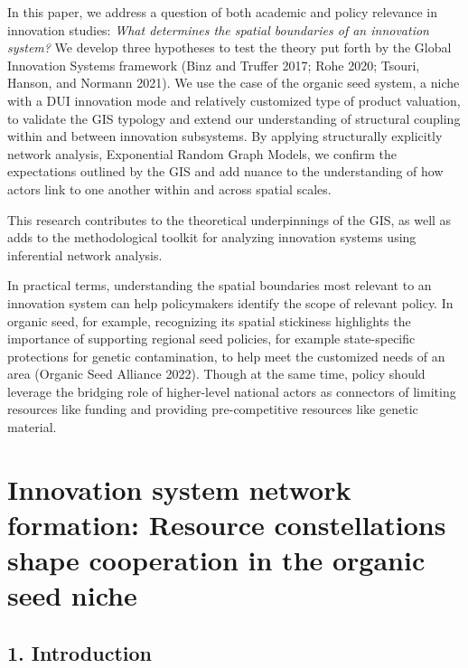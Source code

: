 \documentclass[twoside,12pt,final]{ucthesis-CA2012}
\begin{document}
\begin{ucmainmatter}
In this paper, we address a question of both academic and policy
relevance in innovation studies: \emph{What determines the spatial boundaries
of an innovation system?} We develop three hypotheses to test the theory
put forth by the Global Innovation Systems framework (Binz and Truffer
2017; Rohe 2020; Tsouri, Hanson, and Normann
2021). We use the case of
the organic seed system, a niche with a DUI innovation mode and
relatively customized type of product valuation, to validate the GIS
typology and extend our understanding of structural coupling within and
between innovation subsystems. By applying structurally explicitly
network analysis, Exponential Random Graph Models, we confirm the
expectations outlined by the GIS and add nuance to the understanding of
how actors link to one another within and across spatial scales.

This research contributes to the theoretical underpinnings of the GIS,
as well as adds to the methodological toolkit for analyzing innovation
systems using inferential network analysis.

In practical terms, understanding the spatial boundaries most relevant
to an innovation system can help policymakers identify the scope of
relevant policy. In organic seed, for example, recognizing its spatial
stickiness highlights the importance of supporting regional seed
policies, for example state-specific protections for genetic
contamination, to help meet the customized needs of an area (Organic
Seed Alliance 2022). Though
at the same time, policy should leverage the bridging role of
higher-level national actors as connectors of limiting resources like
funding and providing pre-competitive resources like genetic material.

\hypertarget{innovation-system-network-formation-resource-constellations-shape-cooperation-in-the-organic-seed-niche}{%
\chapter{Innovation system network formation: Resource constellations shape cooperation in the organic seed niche}\label{innovation-system-network-formation-resource-constellations-shape-cooperation-in-the-organic-seed-niche}}


\hypertarget{introduction-3}{%
\section{1. Introduction}\label{introduction-3}}


\end{ucmainmatter}
\end{document}
